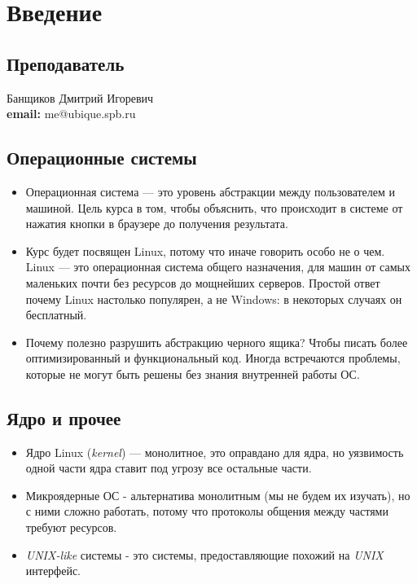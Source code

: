 \documentclass[../../report.tex]{subfiles}
\begin{document}
\chapter{Введение}

\section{Преподаватель}
Банщиков Дмитрий Игоревич\\
\textbf{email:} me@ubique.spb.ru

\section{Операционные системы}
\begin{itemize}
    \item Операционная система --- это уровень абстракции между пользователем и машиной.
    Цель курса в том, чтобы объяснить, что происходит в системе от нажатия кнопки в
    браузере до получения результата.

    \item Курс будет посвящен Linux, потому что иначе говорить особо не о чем. Linux ---
    это операционная система общего назначения, для машин от самых маленьких почти
    без ресурсов до мощнейших серверов. Простой ответ почему Linux настолько
    популярен, а не Windows: в некоторых случаях он бесплатный.

    \item Почему полезно разрушить абстракцию черного ящика? Чтобы писать более
    оптимизированный и функциональный код. Иногда встречаются проблемы, которые не
    могут быть решены без знания внутренней работы ОС.
\end{itemize}

\section{Ядро и прочее}
\begin{itemize}
    \item Ядро Linux (\emph{kernel}) --- монолитное, это оправдано для ядра, но уязвимость одной части ядра
    ставит под угрозу все остальные части.

    \item Микроядерные ОС - альтернатива монолитным (мы не будем их изучать), но с ними
    сложно работать, потому что протоколы общения между частями требуют ресурсов.

    \item \emph{UNIX-like} системы - это системы, предоставляющие похожий на \emph{UNIX} интерфейс.

\end{itemize}
\end{document}
